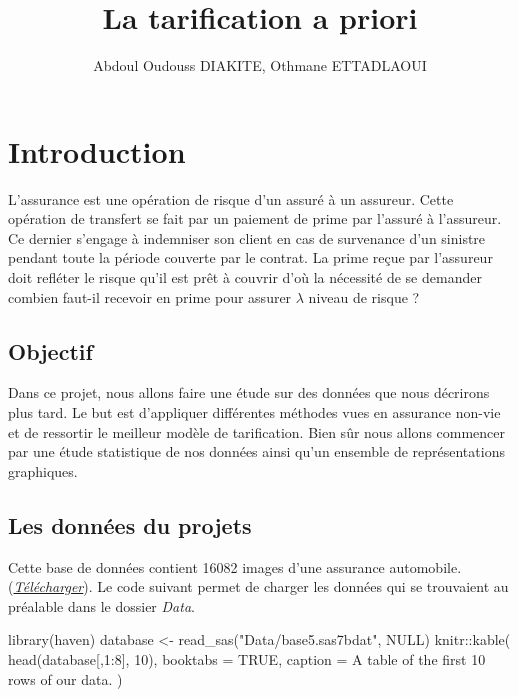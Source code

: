 \documentclass[
]{book}
\title{La tarification a priori}
\author{Abdoul Oudouss DIAKITE, Othmane ETTADLAOUI}
\date{}
\newenvironment{Shaded}{\begin{snugshade}}{\end{snugshade}}
\newcommand{\AttributeTok}[1]{\textcolor[rgb]{0.77,0.63,0.00}{#1}}
\newcommand{\ConstantTok}[1]{\textcolor[rgb]{0.00,0.00,0.00}{#1}}
\newcommand{\DecValTok}[1]{\textcolor[rgb]{0.00,0.00,0.81}{#1}}
\newcommand{\FunctionTok}[1]{\textcolor[rgb]{0.00,0.00,0.00}{#1}}
\newcommand{\NormalTok}[1]{#1}
\newcommand{\OtherTok}[1]{\textcolor[rgb]{0.56,0.35,0.01}{#1}}
\newcommand{\SpecialCharTok}[1]{\textcolor[rgb]{0.00,0.00,0.00}{#1}}
\newcommand{\StringTok}[1]{\textcolor[rgb]{0.31,0.60,0.02}{#1}}
\theoremstyle{definition}
\theoremstyle{definition}
\theoremstyle{definition}
\theoremstyle{definition}
\theoremstyle{remark}
\begin{document}
\maketitle

{
\setcounter{tocdepth}{1}
\tableofcontents
}
\hypertarget{introduction}{%
\chapter*{Introduction}\label{introduction}}

L'assurance est une opération de risque d'un assuré à un assureur. Cette opération de transfert se fait par un paiement de prime par l'assuré à l'assureur. Ce dernier s'engage à indemniser son client en cas de survenance d'un sinistre pendant toute la période couverte par le contrat.
La prime reçue par l'assureur doit refléter le risque qu'il est prêt à couvrir d'où la nécessité de se demander combien faut-il recevoir en prime pour assurer \(\lambda\) niveau de risque ?

\hypertarget{objectif}{%
\section{Objectif}\label{objectif}}

Dans ce projet, nous allons faire une étude sur des données que nous décrirons plus tard. Le but est d'appliquer différentes méthodes vues en assurance non-vie et de ressortir le meilleur modèle de tarification. Bien sûr nous allons commencer par une étude statistique de nos données ainsi qu'un ensemble de représentations graphiques.

\hypertarget{les-donnuxe9es-du-projets}{%
\section{Les données du projets}\label{les-donnuxe9es-du-projets}}

Cette base de données contient 16082 images d'une assurance automobile. (\href{https://github.com/AODiakite/Tarification/blob/master/data/base5.sas7bdat}{\emph{Télécharger}}).
Le code suivant permet de charger les données qui se trouvaient au préalable dans le dossier \emph{Data}.

\begin{Shaded}
\begin{Highlighting}[]
\FunctionTok{library}\NormalTok{(haven)}
\NormalTok{database }\OtherTok{\textless{}{-}} \FunctionTok{read\_sas}\NormalTok{(}\StringTok{"Data/base5.sas7bdat"}\NormalTok{, }
    \ConstantTok{NULL}\NormalTok{)}
\NormalTok{knitr}\SpecialCharTok{::}\FunctionTok{kable}\NormalTok{(}
  \FunctionTok{head}\NormalTok{(database[,}\DecValTok{1}\SpecialCharTok{:}\DecValTok{8}\NormalTok{], }\DecValTok{10}\NormalTok{), }\AttributeTok{booktabs =} \ConstantTok{TRUE}\NormalTok{,}
  \AttributeTok{caption =} \StringTok{\textquotesingle{}A table of the first 10 rows of our data.\textquotesingle{}}
\NormalTok{)}
\end{Highlighting}
\end{Shaded}
\end{document}
